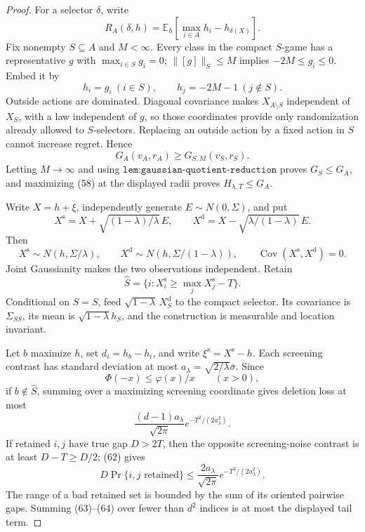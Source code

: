 \documentclass{article}
\begin{document}
\begin{proof}
For a selector \(\delta\), write
\[
R_A(\delta,h)=\mathbb E_h[\max_{i\in A}h_i-h_{\delta(X)}]. \tag{56}
\]
Fix nonempty \(S\subseteq A\) and \(M<\infty\).  Every class in the compact \(S\)-game has a representative \(g\) with \(\max_{i\in S}g_i=0\); \(\lVert[g]\rVert_S\leq M\) implies \(-2M\leq g_i\leq0\).  Embed it by
\[
h_i=g_i\ (i\in S),\qquad h_j=-2M-1\ (j\notin S). \tag{57}
\]
Outside actions are dominated.  Diagonal covariance makes \(X_{A\setminus S}\) independent of \(X_S\), with a law independent of \(g\), so those coordinates provide only randomization already allowed to \(S\)-selectors.  Replacing an outside action by a fixed action in \(S\) cannot increase regret.  Hence
\[
G_A(v_A,r_A)\geq G_{S,M}(v_S,r_S). \tag{58}
\]
Letting \(M\to\infty\) and using \(\texttt{lem:gaussian-quotient-reduction}\) proves \(G_S\leq G_A\), and maximizing (58) at the displayed radii proves \(H_{\lambda,T}\leq G_A\).

Write \(X=h+\xi\), independently generate \(E\sim N(0,\Sigma)\), and put
\[
X^{\mathrm s}=X+\sqrt{(1-\lambda)/\lambda}\,E,\qquad
X^{\mathrm d}=X-\sqrt{\lambda/(1-\lambda)}\,E. \tag{59}
\]
Then
\[
X^{\mathrm s}\sim N(h,\Sigma/\lambda),\qquad
X^{\mathrm d}\sim N(h,\Sigma/(1-\lambda)),\qquad
\operatorname{Cov}(X^{\mathrm s},X^{\mathrm d})=0. \tag{60}
\]
Joint Gaussianity makes the two observations independent.  Retain
\[
\widehat S=\{i:X_i^{\mathrm s}\geq\max_jX_j^{\mathrm s}-T\}. \tag{61}
\]
Conditional on \(\widehat S=S\), feed \(\sqrt{1-\lambda}\,X_S^{\mathrm d}\) to the compact selector.  Its covariance is \(\Sigma_{SS}\), its mean is \(\sqrt{1-\lambda}h_S\), and the construction is measurable and location invariant.

Let \(b\) maximize \(h\), set \(d_i=h_b-h_i\), and write \(\xi^{\mathrm s}=X^{\mathrm s}-h\).  Each screening contrast has standard deviation at most \(a_\lambda=\sqrt{2/\lambda}\bar\sigma\).  Since
\[
\Phi(-x)\leq\varphi(x)/x\qquad(x>0), \tag{62}
\]
if \(b\notin\widehat S\), summing over a maximizing screening coordinate gives deletion loss at most
\[
\frac{(d-1)a_\lambda}{\sqrt{2\pi}}
e^{-T^2/(2a_\lambda^2)}. \tag{63}
\]
If retained \(i,j\) have true gap \(D>2T\), then the opposite screening-noise contrast is at least \(D-T\geq D/2\); (62) gives
\[
D\Pr\{i,j\text{ retained}\}
\leq\frac{2a_\lambda}{\sqrt{2\pi}}e^{-T^2/(2a_\lambda^2)}. \tag{64}
\]
The range of a bad retained set is bounded by the sum of its oriented pairwise gaps.  Summing (63)--(64) over fewer than \(d^2\) indices is at most the displayed tail term.


\end{proof}
\end{document}
